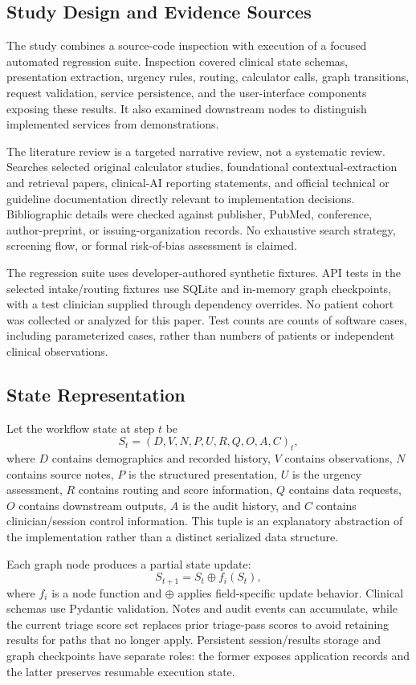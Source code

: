 \documentclass[conference]{IEEEtran}
\begin{document}
\subsection{Study Design and Evidence Sources}
The study combines a source-code inspection with execution of a focused automated regression suite. Inspection covered clinical state schemas, presentation extraction, urgency rules, routing, calculator calls, graph transitions, request validation, service persistence, and the user-interface components exposing these results. It also examined downstream nodes to distinguish implemented services from demonstrations.

The literature review is a targeted narrative review, not a systematic review. Searches selected original calculator studies, foundational contextual-extraction and retrieval papers, clinical-AI reporting statements, and official technical or guideline documentation directly relevant to implementation decisions. Bibliographic details were checked against publisher, PubMed, conference, author-preprint, or issuing-organization records. No exhaustive search strategy, screening flow, or formal risk-of-bias assessment is claimed.

The regression suite uses developer-authored synthetic fixtures. API tests in the selected intake/routing fixtures use SQLite and in-memory graph checkpoints, with a test clinician supplied through dependency overrides. No patient cohort was collected or analyzed for this paper. Test counts are counts of software cases, including parameterized cases, rather than numbers of patients or independent clinical observations.

\subsection{State Representation}
Let the workflow state at step $t$ be
\begin{equation}
S_t=(D,V,N,P,U,R,Q,O,A,C)_t,
\end{equation}
where $D$ contains demographics and recorded history, $V$ contains observations, $N$ contains source notes, $P$ is the structured presentation, $U$ is the urgency assessment, $R$ contains routing and score information, $Q$ contains data requests, $O$ contains downstream outputs, $A$ is the audit history, and $C$ contains clinician/session control information. This tuple is an explanatory abstraction of the implementation rather than a distinct serialized data structure.

Each graph node produces a partial state update:
\begin{equation}
S_{t+1}=S_t\oplus f_i(S_t),
\end{equation}
where $f_i$ is a node function and $\oplus$ applies field-specific update behavior. Clinical schemas use Pydantic validation. Notes and audit events can accumulate, while the current triage score set replaces prior triage-pass scores to avoid retaining results for paths that no longer apply. Persistent session/results storage and graph checkpoints have separate roles: the former exposes application records and the latter preserves resumable execution state.
\end{document}
